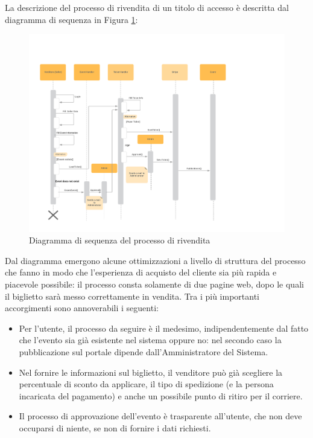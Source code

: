 La descrizione del processo di rivendita di un titolo di accesso è descritta dal diagramma di sequenza in Figura \ref{seqacq}:
\begin{figure}[htbp]
	\centering
	\includegraphics[width=\textwidth,height=\textheight, keepaspectratio, angle = 270]{chapter4/immagini/Rivendita}
	\caption{Diagramma di sequenza del processo di rivendita}
	\label{seqacq}
\end{figure} 
Dal diagramma emergono alcune ottimizzazioni a livello di struttura del processo che fanno in modo che l'esperienza di acquisto del cliente sia più rapida e piacevole possibile: il processo consta solamente di due pagine web, dopo le quali il biglietto sarà messo correttamente in vendita. Tra i più importanti accorgimenti sono annoverabili i seguenti: 
\begin{itemize}
\item Per l'utente, il processo da seguire è il medesimo, indipendentemente dal fatto che l'evento sia già esistente nel sistema oppure no: nel secondo caso la pubblicazione sul portale dipende dall'Amministratore del Sistema. 
\item Nel fornire le informazioni sul biglietto, il venditore può già scegliere la percentuale di sconto da applicare, il tipo di spedizione (e la persona incaricata del pagamento) e anche un possibile punto di ritiro per il corriere.
\item Il processo di approvazione dell'evento è trasparente all'utente, che non deve occuparsi di niente, se non di fornire i dati richiesti. 
\end{itemize}

